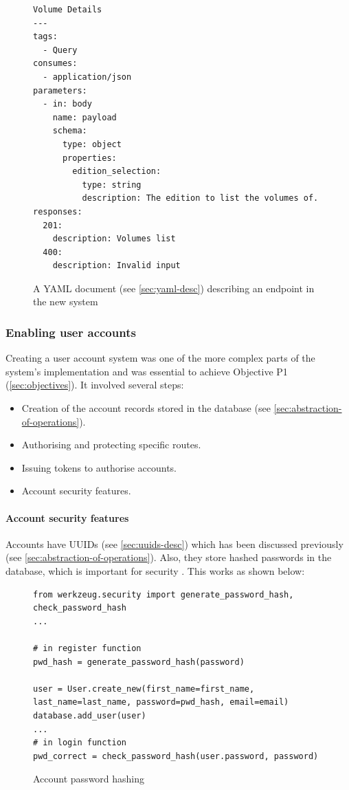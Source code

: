 \documentclass[12pt, letterpaper]{article}
\begin{document}
\begin{flushleft}
\begin{figure}[H]
\begin{verbatim}
Volume Details
---
tags:
  - Query
consumes:
  - application/json
parameters:
  - in: body
    name: payload
    schema:
      type: object
      properties:
        edition_selection:
          type: string
          description: The edition to list the volumes of.
responses:
  201:
    description: Volumes list
  400:
    description: Invalid input
\end{verbatim}
\caption{A YAML document (see \ref{sec:yaml-desc}) describing an endpoint in the new system}
\end{figure}
\end{flushleft}

\subsubsection{Enabling user accounts}\label{sec:impl-enable-user-acc}

\begin{flushleft}
Creating a user account system was one of the more complex parts of the system's implementation and was essential to achieve Objective P1 (\ref{sec:objectives}). It involved several steps:
\end{flushleft}

\begin{itemize}
\item Creation of the account records stored in the database (see \ref{sec:abstraction-of-operations}).
\item Authorising and protecting specific routes.
\item Issuing tokens to authorise accounts.
\item Account security features.
\end{itemize}

\paragraph{Account security features}

Accounts have UUIDs (see \ref{sec:uuids-desc}) which has been discussed previously (see \ref{sec:abstraction-of-operations}). Also, they store hashed passwords in the database, which is important for security \cite{password-security}. This works as shown below:

\begin{flushleft}
\begin{figure}[H]
\begin{verbatim}
from werkzeug.security import generate_password_hash, check_password_hash
...

# in register function
pwd_hash = generate_password_hash(password)

user = User.create_new(first_name=first_name, last_name=last_name, password=pwd_hash, email=email)
database.add_user(user)
...
# in login function
pwd_correct = check_password_hash(user.password, password)
\end{verbatim}
\caption{Account password hashing}
\end{figure}
\end{flushleft}
\end{document}
